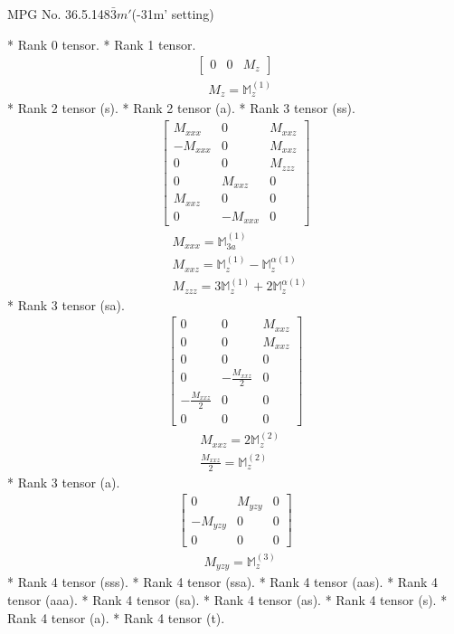 \documentclass[fleqn,8pt,landscape]{jsarticle}
\begin{document}
\setcounter{MaxMatrixCols}{32}

\renewcommand{\tablename}{Table~}
\renewcommand{\figurename}{Figure~}
\begin{center}
\LARGE
MPG No. 36.5.148\quad$\bar{3}m'$\quad(-31m' setting)
\end{center}
* Rank 0 tensor.
* Rank 1 tensor.
\begin{align*}
\begin{bmatrix} 0 & 0 & M_{z} \end{bmatrix}
\end{align*}
\begin{align*}
& M_{z} = \mathbb{M}_{z}^{(1)}
\end{align*}
* Rank 2 tensor (s).
* Rank 2 tensor (a).
* Rank 3 tensor (ss).
\begin{align*}
\begin{bmatrix} M_{xxx} & 0 & M_{xxz} \\ - M_{xxx} & 0 & M_{xxz} \\ 0 & 0 & M_{zzz} \\ 0 & M_{xxz} & 0 \\ M_{xxz} & 0 & 0 \\ 0 & - M_{xxx} & 0 \end{bmatrix}
\end{align*}
\begin{align*}
& M_{xxx} = \mathbb{M}_{3a}^{(1)} \\
& M_{xxz} = \mathbb{M}_{z}^{(1)} - \mathbb{M}_{z}^{\alpha(1)} \\
& M_{zzz} = 3 \mathbb{M}_{z}^{(1)} + 2 \mathbb{M}_{z}^{\alpha(1)}
\end{align*}
* Rank 3 tensor (sa).
\begin{align*}
\begin{bmatrix} 0 & 0 & M_{xxz} \\ 0 & 0 & M_{xxz} \\ 0 & 0 & 0 \\ 0 & - \frac{M_{xxz}}{2} & 0 \\ - \frac{M_{xxz}}{2} & 0 & 0 \\ 0 & 0 & 0 \end{bmatrix}
\end{align*}
\begin{align*}
& M_{xxz} = 2 \mathbb{M}_{z}^{(2)} \\
& \frac{M_{xxz}}{2} = \mathbb{M}_{z}^{(2)}
\end{align*}
* Rank 3 tensor (a).
\begin{align*}
\begin{bmatrix} 0 & M_{yzy} & 0 \\ - M_{yzy} & 0 & 0 \\ 0 & 0 & 0 \end{bmatrix}
\end{align*}
\begin{align*}
& M_{yzy} = \mathbb{M}_{z}^{(3)}
\end{align*}
* Rank 4 tensor (sss).
* Rank 4 tensor (ssa).
* Rank 4 tensor (aas).
* Rank 4 tensor (aaa).
* Rank 4 tensor (sa).
* Rank 4 tensor (as).
* Rank 4 tensor (s).
* Rank 4 tensor (a).
* Rank 4 tensor (t).
\end{document}
